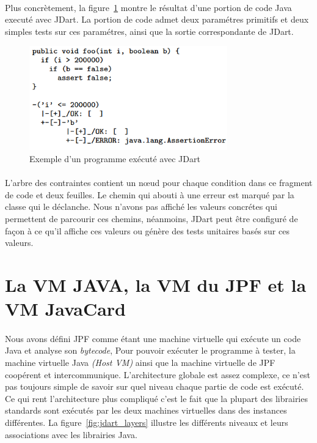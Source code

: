 			\paragraph{}
				Plus concrètement, la figure~\ref{fig:jdart_sample} montre le résultat d'une portion de code Java executé avec JDart.
				La portion de code admet deux paramétres primitifs et deux simples tests sur ces paramétres, ainsi que la sortie correspondante
				de JDart.
				
			\begin{figure}[H]
				\centering
					\includegraphics[scale=0.5]{images/jdart_exemple.png}
				\caption{Exemple d'un programme exécuté 
avec JDart}
				\label{fig:jdart_sample} 
			\end{figure}
			
			\paragraph{}
				L'arbre des contraintes contient un n\oe{}ud pour chaque condition dans ce fragment de code et deux feuilles.
				Le chemin qui abouti à une erreur est marqué par la classe qui le déclanche.
				Nous n'avons pas affiché les valeurs concrétes qui permettent de parcourir ces chemins, néanmoins, JDart peut être configuré
				de façon à ce qu'il affiche ces valeurs ou génère des tests unitaires basés sur ces valeurs.
      
	\section{La VM JAVA, la VM du JPF et la VM JavaCard}
		\paragraph{}
			Nous avons défini \gls{JPF} comme étant une machine virtuelle qui exécute un code Java et analyse son \textit{\gls{bytecode}},
			Pour pouvoir exécuter le programme à tester, la machine virtuelle Java \textit{(Host VM)} ainsi que la machine virtuelle de \gls{JPF}
			coopérent et intercommunique.
			L'architecture globale est assez complexe, ce n'est pas toujours simple de savoir sur quel niveau chaque partie de code est exécuté.
			Ce qui rent l'architecture plus compliqué c'est le fait que la plupart des librairies standards sont exécutés par les deux machines
			virtuelles dans des instances différentes.
			La figure~\ref{fig:jdart_layers} illustre les différents niveaux et leurs associations avec les librairies Java.
			
